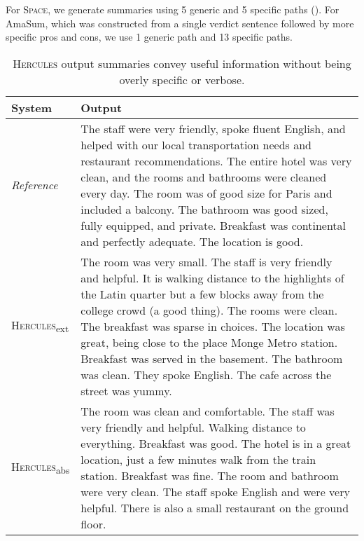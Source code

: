 \documentclass[11pt]{article}
\begin{document}
For \textsc{Space}, we generate summaries using 5 generic and 5 specific paths (). For AmaSum, which was constructed from a single verdict sentence followed by more specific pros and cons, we use 1 generic path and 13 specific paths. 


\begin{table*}[ht]
\renewcommand{\arraystretch}{1.2}
    \centering
    \small
    \begin{tabular}{@{}m{2cm}@{~}|@{~}m{13.5cm}@{}}
    \textbf{System} & \textbf{Output} \\
    \hline\hline
\textit{Reference}  &  The staff were very friendly, spoke fluent English, and helped with our local transportation needs and restaurant recommendations. The entire hotel was very clean, and the rooms and bathrooms were cleaned every day. The room was of good size for Paris and included a balcony. The bathroom was good sized, fully equipped, and private. Breakfast was continental and perfectly adequate. The location is good.  \\ 
\hline
\textsc{Hercules}\textsubscript{ext}  &  The room was very small. The staff is very friendly and helpful. It is walking distance to the highlights of the Latin quarter but a few blocks away from the college crowd (a good thing). The rooms were clean. The breakfast was sparse in choices. The location was great, being close to the place Monge Metro station. Breakfast was served in the basement. The bathroom was clean. They spoke English. The cafe across the street was yummy.  \\ 
\hline
\textsc{Hercules}\textsubscript{abs}  &  The room was clean and comfortable. The staff was very friendly and helpful. Walking distance to everything. Breakfast was good. The hotel is in a great location, just a few minutes walk from the train station. Breakfast was fine. The room and bathroom were very clean. The staff spoke English and were very helpful. There is also a small restaurant on the ground floor.  \\ 



    \end{tabular}
\caption{\textsc{Hercules} output summaries convey useful information without being overly specific or verbose.}
    \vspace*{-.2cm}
    \label{tab:output}
\end{table*}
\end{document}
